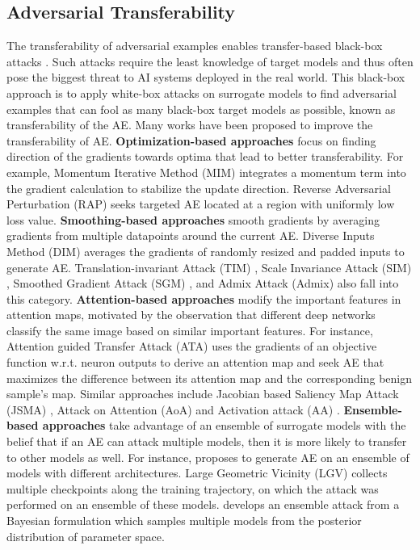 \documentclass[letterpaper]{article} %
\theoremstyle{plain}
\theoremstyle{definition}
\begin{document}
\subsection {Adversarial Transferability}
The transferability of adversarial examples enables transfer-based black-box attacks \cite{szegedy2014intriguing}. Such attacks require the least knowledge of target models and thus often pose the biggest threat to AI systems deployed in the real world. This black-box approach is to apply white-box attacks on surrogate models to find adversarial examples that can fool as many black-box target models as possible, known as transferability of the AE. Many works have been proposed to improve the transferability of AE. \textbf{Optimization-based approaches} focus on finding direction of the gradients towards optima that lead to better transferability. For example, Momentum Iterative Method (MIM) \cite{dong2018boosting} integrates a momentum term into the gradient calculation to stabilize the update direction. Reverse Adversarial Perturbation (RAP) \cite{qin2022boosting} seeks targeted AE located at a region with uniformly low loss value. \textbf{Smoothing-based approaches} smooth gradients by averaging gradients from multiple datapoints around the current AE. Diverse Inputs Method (DIM) \cite{xie2019improving} averages the gradients of randomly resized and padded inputs to generate AE. Translation-invariant Attack (TIM) \cite{dong2019evading}, Scale Invariance Attack (SIM) \cite{lin2020nesterov}, Smoothed Gradient Attack (SGM) \cite{wu2020towards}, and Admix Attack (Admix) \cite{wang2021admix} also fall into this category. \textbf{Attention-based approaches} modify the important features in attention maps, motivated by the observation that different deep networks classify the same image based on similar important features. For instance, Attention guided Transfer Attack (ATA) \cite{wu2020boosting} uses the gradients of an objective function w.r.t. neuron outputs to derive an attention map and seek AE that maximizes the difference between its attention map and the corresponding benign sample's map. Similar approaches include Jacobian based Saliency Map Attack (JSMA) \cite{papernot2016limitations}, Attack on Attention (AoA) \cite{chen2020universal} and Activation attack (AA) \cite{inkawhich2019feature}. \textbf{Ensemble-based approaches} take advantage of an ensemble of surrogate models with the belief that if an AE can attack multiple models, then it is more likely to transfer to other models as well. For instance, \cite{liu2017delving} proposes to generate AE on an ensemble of models with different architectures. Large Geometric Vicinity (LGV) \cite{gubri2022lgv} collects multiple checkpoints along the training trajectory, on which the  attack was performed on an ensemble of these models. \cite{li2023making} develops an ensemble attack from a Bayesian formulation which samples multiple models from the posterior distribution of parameter space.
\end{document}
